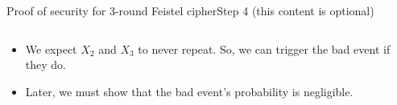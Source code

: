 \documentclass[aspectratio=169, lualatex, handout]{beamer}
\begin{document}
	\begin{frame}{Proof of security for 3-round Feistel cipher}{Step 4 (this content is optional)}
		\begin{columns}[c]
			\begin{column}{0.5\textwidth}
				\begin{itemize}[<+->]
					\item We expect $X_2$ and $X_3$ to never repeat. So, we can trigger the bad event if they do.
					\item Later, we must show that the bad event's probability is negligible.
				\end{itemize}
			\end{column}
			\begin{column}{0.5\textwidth}
				\vspace{-1.5cm}
				\begin{center}
				\end{center}
			\end{column}
		\end{columns}
	\end{frame}
\end{document}
